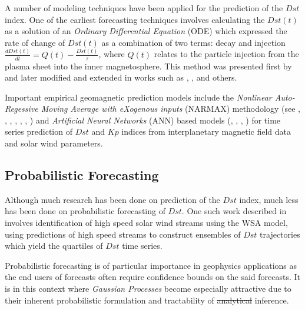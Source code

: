 \documentclass{article}
\providecommand{\DIFadd}[1]{{\protect\color{blue}\uwave{#1}}} %
\providecommand{\DIFdel}[1]{{\protect\color{red}\sout{#1}}}                      %
\providecommand{\DIFaddbegin}{} %
\providecommand{\DIFaddend}{} %
\providecommand{\DIFdelbegin}{} %
\providecommand{\DIFdelend}{} %
\newcommand{\DIFscaledelfig}{0.5}
\newlength{\DIFdelgraphicswidth} %
\newlength{\DIFdelgraphicsheight} %
\newcommand{\DIFaddincludegraphics}[2][]{{\color{blue}\fbox{\DIFOincludegraphics[#1]{#2}}}} %
\newcommand{\DIFdelincludegraphics}[2][]{%
\sbox{\DIFdelgraphicsbox}{\DIFOincludegraphics[#1]{#2}}%
\settoboxwidth{\DIFdelgraphicswidth}{\DIFdelgraphicsbox} %
\settoboxtotalheight{\DIFdelgraphicsheight}{\DIFdelgraphicsbox} %
\scalebox{\DIFscaledelfig}{%
\parbox[b]{\DIFdelgraphicswidth}{\usebox{\DIFdelgraphicsbox}\\[-\baselineskip] \rule{\DIFdelgraphicswidth}{0em}}\llap{\resizebox{\DIFdelgraphicswidth}{\DIFdelgraphicsheight}{%
\setlength{\unitlength}{\DIFdelgraphicswidth}%
\begin{picture}(1,1)%
\thicklines\linethickness{2pt} %
{\color[rgb]{1,0,0}\put(0,0){\framebox(1,1){}}}%
{\color[rgb]{1,0,0}\put(0,0){\line( 1,1){1}}}%
{\color[rgb]{1,0,0}\put(0,1){\line(1,-1){1}}}%
\end{picture}%
}\hspace*{3pt}}} %
} %
\DeclareRobustCommand{\DIFaddbegin}{\DIFOaddbegin \let\includegraphics\DIFaddincludegraphics} %
\DeclareRobustCommand{\DIFaddend}{\DIFOaddend \let\includegraphics\DIFOincludegraphics} %
\DeclareRobustCommand{\DIFdelbegin}{\DIFOdelbegin \let\includegraphics\DIFdelincludegraphics} %
\DeclareRobustCommand{\DIFdelend}{\DIFOaddend \let\includegraphics\DIFOincludegraphics} %
\begin{document}
A number of modeling techniques have been applied for the prediction of the $Dst$ index. One of the earliest forecasting techniques involves calculating the $Dst(t)$ as a solution of an \emph{Ordinary Differential Equation} (ODE) which expressed the rate of change of $Dst(t)$ as a combination of two terms: decay and injection $\frac{d Dst(t)}{dt} = Q(t) - \frac{Dst(t)}{\tau}$, where $Q(t)$ relates to the particle injection from the plasma sheet into the inner magnetosphere. This method was presented first by \citet{JGR:JGR10260} and later modified and extended in works such as \citet{Wang:Dst}, \citet{JGRA:JGRA14856}, \citet{Ballatore2014} and others.

Important empirical geomagnetic prediction models include the \emph{Nonlinear Auto-Regessive Moving Average with eXogenous inputs} (NARMAX) methodology (see \citet{doi:10.1080/00207178908559767}, \citet{GRL:GRL13494}, \citet{GRL:GRL20944}, \citet{JGRA:JGRA18657}, \citet{balikhin:narmax}, \citet{JGRA:JGRA20661}, \citet{JGRA:JGRA50192}) and \emph{Artificial Neural Networks} (ANN) based models (\citet{Lund}, \citet{JGRA:JGRA17461}, \citet{SWE:SWE286}, \citet{pallocchia:hal-00318011}) for time series prediction of $Dst$ and $Kp$ indices from interplanetary magnetic field data and solar wind parameters. 

\subsection{Probabilistic Forecasting}
Although much research has been done on prediction of the $Dst$ index, much less has been done on probabilistic forecasting of $Dst$. One such work described in \citet{McPherron:2013} involves identification of high speed solar wind streams using the WSA model, using predictions of high speed streams to construct ensembles of $Dst$ trajectories which yield the quartiles of $Dst$ time series. 

Probabilistic forecasting is of particular importance in geophysics applications as the end users of forecasts often require confidence bounds on the said forecasts. It is in this context where \emph{Gaussian Processes} become especially attractive due to their inherent probabilistic formulation and tractability of \DIFdelbegin \DIFdel{analytical }\DIFdelend \DIFaddbegin \DIFadd{exact }\DIFaddend inference.
\end{document}
